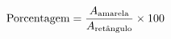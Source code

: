 \documentclass[preview]{standalone}
\begin{document}
\begin{align*}
\special{dvisvgm:raw <g id='unique000'>}\text{Porcentagem} = \frac{A_{\text{amarela}}}{A_{\text{retângulo}}} \times 100\special{dvisvgm:raw </g>}
\end{align*}
\end{document}
